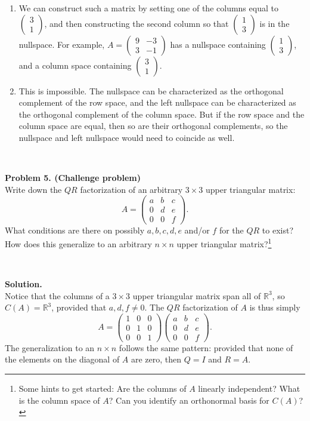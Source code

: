 \documentclass[11pt]{article}
\begin{document}
\begin{enumerate}
\item We can construct such a matrix by setting one of the columns equal to $\begin{pmatrix} 3\\1 \end{pmatrix}$, and then constructing the second column so that $\begin{pmatrix} 1\\3 \end{pmatrix}$ is in the nullspace. For example, $A = \begin{pmatrix} 9 & -3 \\ 3 & -1 \end{pmatrix}$ has a nullspace containing $\begin{pmatrix} 1\\3 \end{pmatrix}$, and a column space containing $\begin{pmatrix} 3\\1 \end{pmatrix}$.

\item This is impossible. The nullspace can be characterized as the orthogonal complement of the row space, and the left nullspace can be characterized as the orthogonal complement of the column space. But if the row space and the column space are equal, then so are their orthogonal complements, so the nullspace and left nullspace would need to coincide as well.
\end{enumerate}

\

\noindent \textbf{Problem 5. (Challenge problem)}\\
Write down the $QR$ factorization of an arbitrary $3\times 3$ upper triangular matrix:
$$A = \begin{pmatrix} a & b & c \\ 0 & d & e \\ 0 & 0 & f \end{pmatrix}.$$
What conditions are there on possibly $a,b,c,d,e$ and/or $f$ for the $QR$ to exist? How does this generalize to an arbitrary $n\times n$ upper triangular matrix?\footnote{Some hints to get started: Are the columns of $A$ linearly independent? What is the column space of $A$? Can you identify an orthonormal basis for $C(A)$?}

\

\noindent \textbf{Solution.} \\
Notice that the columns of a $3\times 3$ upper triangular matrix span all of $\mathbb{R}^3$, so $C(A)=\mathbb{R}^3$, provided that $a,d,f\neq 0$. The $QR$ factorization of $A$ is thus simply
$$A=\begin{pmatrix} 1 & 0 & 0 \\ 0 & 1 & 0 \\ 0 & 0 & 1 \end{pmatrix}  \begin{pmatrix} a & b & c \\ 0 & d & e \\ 0 & 0 & f \end{pmatrix}.$$
The generalization to an $n\times n$ follows the same pattern: provided that none of the elements on the diagonal of $A$ are zero, then $Q=I$ and $R=A$. 
\end{document}

